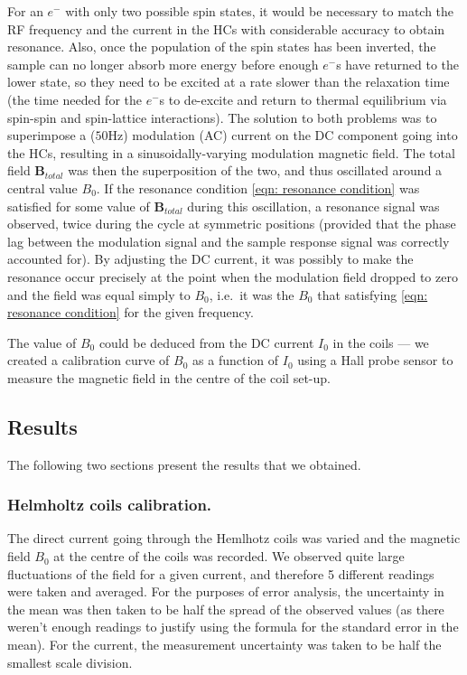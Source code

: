 \documentclass[a4paper]{jpconf}
\numberwithin{equation}{section}
\begin{document}
For an $e^-$ with only two possible spin states, it would be necessary to match the RF frequency and the current in the HCs with considerable accuracy to obtain resonance. Also, once the population of the spin states has been inverted, the sample can no longer absorb more energy before enough $e^-$s have returned to the lower state, so they need to be excited at a rate slower than the relaxation time (the time needed for the $e^-$s to de-excite and return to thermal equilibrium via spin-spin and spin-lattice interactions). The solution to both problems was to superimpose a ($50 \si{\hertz}$) modulation (AC) current on the DC component going into the HCs, resulting in a sinusoidally-varying modulation magnetic field. The total field $\mathbf{B}_{total}$ was then the superposition of the two, and thus oscillated around a central value $B_0$. If the resonance condition \eqref{eqn: resonance condition} was satisfied for some value of $\mathbf{B}_{total}$ during this oscillation, a resonance signal was observed, twice during the cycle at symmetric positions (provided that the phase lag between the modulation signal and the sample response signal was correctly accounted for). By adjusting the DC current, it was possibly to make the resonance occur precisely at the point when the modulation field dropped to zero and the field was equal simply to $B_0$, i.e.\ it was the $B_0$ that satisfying \eqref{eqn: resonance condition} for the given frequency.

The value of $B_0$ could be deduced from the DC current $I_0$ in the coils --- we created a calibration curve of $B_0$ as a function of $I_0$ using a Hall probe sensor to measure the magnetic field in the centre of the coil set-up.

\subsection{Results}
The following two sections present the results that we obtained.

\subsubsection{Helmholtz coils calibration.}
The direct current going through the Hemlhotz coils was varied and the magnetic field $B_0$ at the centre of the coils was recorded. We observed quite large fluctuations of the field for a given current, and therefore 5 different readings were taken and averaged. For the purposes of error analysis, the uncertainty in the mean was then taken to be half the spread of the observed values (as there weren't enough readings to justify using the formula for the standard error in the mean). For the current, the measurement uncertainty was taken to be half the smallest scale division. 
\end{document}
